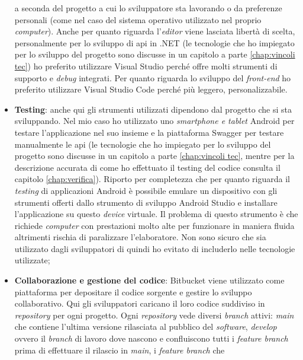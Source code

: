\begin{itemize}
            a seconda del progetto a cui lo sviluppatore sta lavorando o da preferenze personali (come nel caso del 
            sistema operativo utilizzato nel proprio \textit{computer}). Anche per quanto riguarda l'\textit{editor} viene lasciata 
            libertà di scelta, personalmente per lo sviluppo di \gls{api} in .NET (le tecnologie che ho impiegato per lo sviluppo del 
            progetto sono discusse in un capitolo a parte \ref{chap:vincoli tec}) ho preferito utilizzare Visual Studio perché offre 
            molti strumenti di supporto e \textit{debug} integrati. Per quanto riguarda lo sviluppo del \textit{front-end} ho 
            preferito utilizzare Visual Studio Code perché più leggero, personalizzabile.
      \item \textbf{Testing}: anche qui gli strumenti utilizzati dipendono dal progetto che si sta sviluppando. Nel mio 
            caso ho utilizzato uno \textit{smartphone e tablet} Android per testare l'applicazione nel suo insieme e la 
            piattaforma Swagger per testare manualmente le \gls{api} (le tecnologie che ho impiegato per lo sviluppo del 
            progetto sono discusse in un capitolo a parte \ref{chap:vincoli tec}, mentre per la descrizione accurata di come ho 
            effettuato il testing del codice consulta il capitolo \ref{chap:verifica}). Riporto per completezza che per 
            quanto riguarda il \textit{testing} di applicazioni Android è possibile emulare un dispositivo con gli 
            strumenti offerti dallo strumento di sviluppo Android Studio e installare l'applicazione su questo \textit{device} 
            virtuale. Il problema di questo strumento è che richiede \textit{computer} con prestazioni molto alte per funzionare 
            in maniera fluida altrimenti rischia di paralizzare l'elaboratore. Non sono sicuro che sia utilizzato dagli 
            sviluppatori di {\company} quindi ho evitato di includerlo nelle tecnologie utilizzate;
      \item \textbf{Collaborazione e gestione del codice}: Bitbucket viene utilizzato come piattaforma per depositare il codice 
            sorgente e gestire lo sviluppo collaborativo. Qui gli sviluppatori caricano il loro 
            codice suddiviso in \textit{repository} per ogni progetto. Ogni \textit{repository} vede diversi 
            \textit{branch} attivi: \textit{main} che contiene l'ultima versione rilasciata al pubblico del \textit{software}, 
            \textit{develop} ovvero il \textit{branch} di lavoro dove nascono e confluiscono tutti i 
            \textit{feature branch} prima di effettuare il rilascio in \textit{main}, i \textit{feature branch} che 

\end{itemize}
